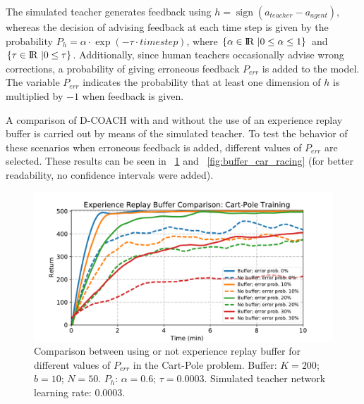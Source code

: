 The simulated teacher generates feedback using $h = \operatorname{sign}(a_{\mathit{teacher}} - a_{\mathit{agent}})$, whereas the decision of advising feedback at each time step is given by the probability $P_{h} = \alpha \cdot\exp(-\tau\cdot \mathit{timestep})$, where $\{\alpha \in {\rm I\!R}\ | 0 \le \alpha \le 1\}$ and $\{\tau \in {\rm I\!R}\ | 0 \le \tau\}$. Additionally, since human teachers occasionally advise wrong corrections, a probability of giving erroneous feedback $P_{\mathit{err}}$ is added to the model. The variable $P_{\mathit{err}}$ indicates the probability that at least one dimension of $h$ is multiplied by $-1$ when feedback is given.

A comparison of D-COACH with and without the use of an experience replay buffer is carried out by means of the simulated teacher. To test the behavior of these scenarios when erroneous feedback is added, different values of $P_{\mathit{err}}$ are selected. These results can be seen in \figurename~{\ref{fig:buffer_cart_pole}} and \figurename~{\ref{fig:buffer_car_racing}} (for better readability, no confidence intervals were added).

\begin{figure}[t]
    \centering
    \includegraphics[width=0.9\linewidth]{imagenes/cap3/buffer_cart_pole.pdf}
    \caption{Comparison between using or not experience replay buffer for different values of $P_\mathit{err}$ in the Cart-Pole problem. Buffer: $K = 200$; $b = 10$; $N = 50$. $P_{h}$: $\alpha = 0.6$; $\tau = 0.0003$. Simulated teacher network learning rate: $0.0003$.}
    \label{fig:buffer_cart_pole}
\end{figure}

